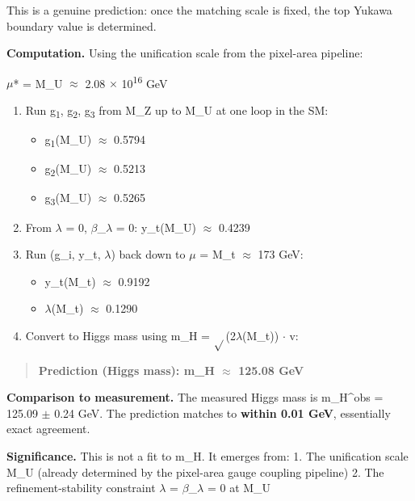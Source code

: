 \documentclass[11pt,a4paper]{article}
\theoremstyle{remark}
\providecommand{\tightlist}{%
  \setlength{\itemsep}{0pt}\setlength{\parskip}{0pt}}
\begin{document}
This is a genuine prediction: once the matching scale is fixed, the top Yukawa boundary value is determined.

\textbf{Computation.} Using the unification scale from the pixel-area pipeline:

\ensuremath{\mu}* = M\_U \ensuremath{\approx} 2.08 \ensuremath{\times} 10\textsuperscript{16} GeV

\begin{enumerate}
\def\labelenumi{\arabic{enumi}.}
\item
  Run g\textsubscript{1}, g\textsubscript{2}, g\textsubscript{3} from M\_Z up to M\_U at one loop in the SM:

  \begin{itemize}
  \tightlist
  \item
    g\textsubscript{1}(M\_U) \ensuremath{\approx} 0.5794
  \item
    g\textsubscript{2}(M\_U) \ensuremath{\approx} 0.5213
  \item
    g\textsubscript{3}(M\_U) \ensuremath{\approx} 0.5265
  \end{itemize}
\item
  From \ensuremath{\lambda} = 0, \ensuremath{\beta}\_\ensuremath{\lambda} = 0: y\_t(M\_U) \ensuremath{\approx} 0.4239
\item
  Run (g\_i, y\_t, \ensuremath{\lambda}) back down to \ensuremath{\mu} = M\_t \ensuremath{\approx} 173 GeV:

  \begin{itemize}
  \tightlist
  \item
    y\_t(M\_t) \ensuremath{\approx} 0.9192
  \item
    \ensuremath{\lambda}(M\_t) \ensuremath{\approx} 0.1290
  \end{itemize}
\item
  Convert to Higgs mass using m\_H = \ensuremath{\sqrt{}}(2\ensuremath{\lambda}(M\_t)) \ensuremath{\cdot} v:
\end{enumerate}

\begin{quote}
\textbf{Prediction (Higgs mass): m\_H \ensuremath{\approx} 125.08 GeV}
\end{quote}

\textbf{Comparison to measurement.} The measured Higgs mass is m\_H\^{}obs = 125.09 \ensuremath{\pm} 0.24 GeV. The prediction matches to \textbf{within 0.01 GeV}, essentially exact agreement.

\textbf{Significance.} This is not a fit to m\_H. It emerges from:
1. The unification scale M\_U (already determined by the pixel-area gauge coupling pipeline)
2. The refinement-stability constraint \ensuremath{\lambda} = \ensuremath{\beta}\_\ensuremath{\lambda} = 0 at M\_U
\end{document}
